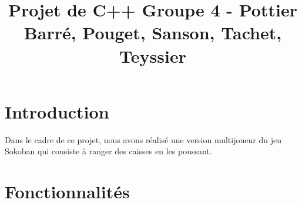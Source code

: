 \documentclass{article}
\begin{document}
\title{Projet de C++ Groupe 4 - Pottier Barré, Pouget, Sanson, Tachet, Teyssier}
\date{}
\maketitle

\section{Introduction}

Dans le cadre de ce projet, nous avons réalisé une version multijoueur du jeu Sokoban qui consiste à ranger des caisses en les poussant. \\

\section{Fonctionnalités}
\end{document}
